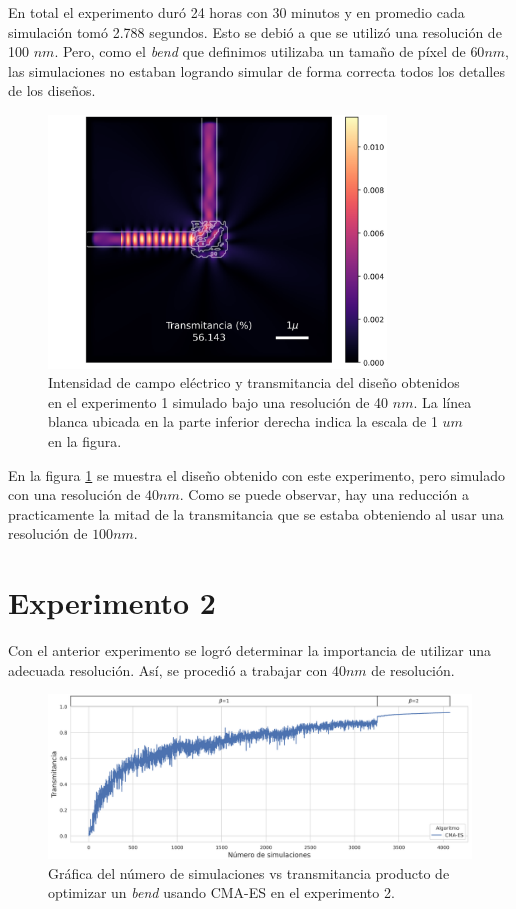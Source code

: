 En total el experimento duró 24 horas con 30 minutos y en promedio cada simulación tomó 2.788 segundos.
Esto se debió a que se utilizó una resolución de 100 $nm$.
Pero, como el \emph{bend} que definimos utilizaba un tamaño de píxel de $60 nm$, las simulaciones no estaban logrando simular de forma correcta todos los detalles de los diseños.

\begin{figure}
  \centering
  \includegraphics[width=0.80\textwidth]{image/results/device-v1-r40.png}
  \caption{Intensidad de campo eléctrico y transmitancia del diseño obtenidos en el experimento 1 simulado bajo una resolución de 40 $nm$. La línea blanca ubicada en la parte inferior derecha indica la escala de 1 $um$ en la figura.}
  \label{fig:exp1}
\end{figure}

En la figura \ref{fig:exp1} se muestra el diseño obtenido con este experimento, pero simulado con una resolución de $40 nm$.
Como se puede observar, hay una reducción a practicamente la mitad de la transmitancia que se estaba obteniendo al usar una resolución de $100 nm$.

\section{Experimento 2}

Con el anterior experimento se logró determinar la importancia de utilizar una adecuada resolución. Así, se procedió a trabajar con $40 nm$ de resolución.

\begin{figure}[ht]
  \centering
  \includegraphics[width=\textwidth]{image/results/iterations_v2.png}
  \caption{Gráfica del número de simulaciones vs transmitancia producto de optimizar un \emph{bend} usando CMA-ES en el experimento 2.}
  \label{fig:iterations-v2}
\end{figure}


